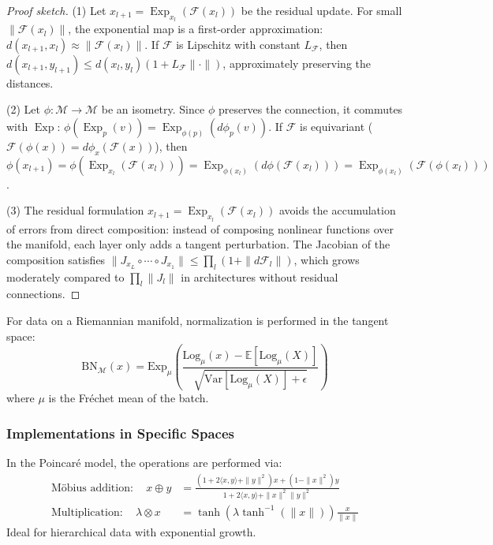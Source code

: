 \begin{proof}[Proof sketch]
(1) Let $x_{l+1} = \operatorname{Exp}_{x_l}(\mathcal{F}(x_l))$ be the residual update. For small $\|\mathcal{F}(x_l)\|$, the exponential map is a first-order approximation: $d(x_{l+1}, x_l) \approx \|\mathcal{F}(x_l)\|$. If $\mathcal{F}$ is Lipschitz with constant $L_\mathcal{F}$, then $d(x_{l+1}, y_{l+1}) \leq d(x_l, y_l)(1 + L_\mathcal{F} \|\cdot\|)$, approximately preserving the distances.

(2) Let $\phi: \mathcal{M} \to \mathcal{M}$ be an isometry. Since $\phi$ preserves the connection, it commutes with $\operatorname{Exp}$: $\phi(\operatorname{Exp}_p(v)) = \operatorname{Exp}_{\phi(p)}(d\phi_p(v))$. If $\mathcal{F}$ is equivariant ($\mathcal{F}(\phi(x)) = d\phi_x(\mathcal{F}(x))$), then $\phi(x_{l+1}) = \phi(\operatorname{Exp}_{x_l}(\mathcal{F}(x_l))) = \operatorname{Exp}_{\phi(x_l)}(d\phi(\mathcal{F}(x_l))) = \operatorname{Exp}_{\phi(x_l)}(\mathcal{F}(\phi(x_l)))$.

(3) The residual formulation $x_{l+1} = \operatorname{Exp}_{x_l}(\mathcal{F}(x_l))$ avoids the accumulation of errors from direct composition: instead of composing nonlinear functions over the manifold, each layer only adds a tangent perturbation. The Jacobian of the composition satisfies $\|J_{x_{L}} \circ \cdots \circ J_{x_1}\| \leq \prod_l (1 + \|d\mathcal{F}_l\|)$, which grows moderately compared to $\prod_l \|J_l\|$ in architectures without residual connections.
\end{proof}

\begin{definition}
For data on a Riemannian manifold, normalization is performed in the tangent space:
\[
\text{BN}_\mathcal{M}(x) = \text{Exp}_{\mu} \left( \frac{\text{Log}_\mu(x) - \mathbb{E}[\text{Log}_\mu(X)]}{\sqrt{\text{Var}[\text{Log}_\mu(X)] + \epsilon}} \right)
\]
where \(\mu\) is the Fréchet mean of the batch.
\end{definition}

\subsubsection{Implementations in Specific Spaces}

\begin{example}
In the Poincaré model, the operations are performed via:
\begin{align}
\text{Möbius addition}: \quad x \oplus y &= \frac{(1+2\langle x,y\rangle + \|y\|^2)x + (1-\|x\|^2)y}{1 + 2\langle x,y\rangle + \|x\|^2\|y\|^2} \\
\text{Multiplication}: \quad \lambda \otimes x &= \tanh(\lambda \tanh^{-1}(\|x\|)) \frac{x}{\|x\|}
\end{align}
Ideal for hierarchical data with exponential growth.
\end{example}

